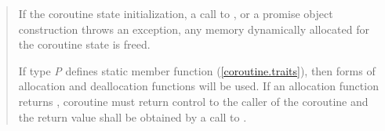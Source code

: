 \begin{quote}
\pnum
If the coroutine state initialization, a call to , or a promise object construction throws
an exception, 
any memory dynamically allocated 
for the coroutine state is freed.

\pnum
If type \textit{P} defines static member function  (\ref{coroutine.traits}), then  forms of allocation and deallocation functions will be used. If an allocation function returns , coroutine must return control to the caller of the coroutine and the return value shall be obtained by a call to .



%

\end{quote}